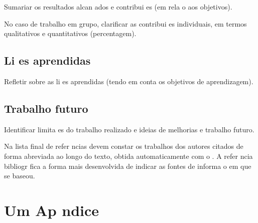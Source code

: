 \documentclass{article}
\begin{document}
\begin{info}
Sumariar os resultados alcan ados e contribui es (em rela o aos  objetivos).

No caso de trabalho em grupo, clarificar as contribui es individuais, em termos qualitativos e quantitativos (percentagem).
\end{info}

\lipsum[11]

\section{Li es aprendidas}

\begin{info}
Refletir sobre as li es aprendidas (tendo em conta os objetivos de aprendizagem).
\end{info}

\lipsum[12]

\section{Trabalho futuro}

\begin{info}
Identificar limita es do trabalho realizado e ideias de melhorias e trabalho futuro.
\end{info}




\renewcommand{\bibname}{Refer ncias bibliogr ficas}
\printbibliography
{}  %

\begin{info}
Na lista final de refer ncias devem constar os trabalhos dos autores
citados de forma abreviada ao longo do texto, obtida automaticamente
com o .
A refer ncia bibliogr fica   a forma mais desenvolvida de indicar as
fontes de informa o em que se baseou. 
\end{info}



\chapter{Um Ap ndice}
\end{document}
